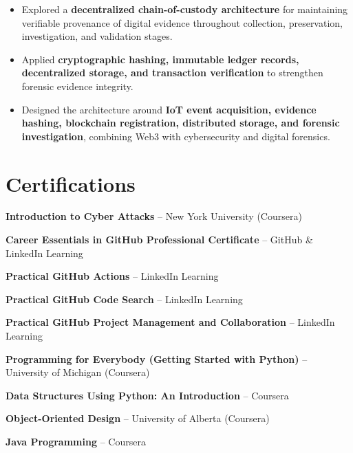 \documentclass[a4paper,11pt]{article}
\newcommand{\resumeItem}[1]{
    \item \small{#1 \vspace{-2pt}}
}
\begin{document}
\begin{itemize}[leftmargin=*]

\resumeItem{Explored a \textbf{decentralized chain-of-custody architecture} for maintaining verifiable provenance of digital evidence throughout collection, preservation, investigation, and validation stages.}

\resumeItem{Applied \textbf{cryptographic hashing, immutable ledger records, decentralized storage, and transaction verification} to strengthen forensic evidence integrity.}

\resumeItem{Designed the architecture around \textbf{IoT event acquisition, evidence hashing, blockchain registration, distributed storage, and forensic investigation}, combining Web3 with cybersecurity and digital forensics.}

\end{itemize}

\vspace{-8pt}


\section{Certifications}

\begin{itemize}[leftmargin=0in, label={}]

\small{

\item{
\textbf{Introduction to Cyber Attacks} -- New York University (Coursera)
}

\item{
\textbf{Career Essentials in GitHub Professional Certificate} -- GitHub \& LinkedIn Learning
}

\item{
\textbf{Practical GitHub Actions} -- LinkedIn Learning
}

\item{
\textbf{Practical GitHub Code Search} -- LinkedIn Learning
}

\item{
\textbf{Practical GitHub Project Management and Collaboration} -- LinkedIn Learning
}

\item{
\textbf{Programming for Everybody (Getting Started with Python)} -- University of Michigan (Coursera)
}

\item{
\textbf{Data Structures Using Python: An Introduction} -- Coursera
}

\item{
\textbf{Object-Oriented Design} -- University of Alberta (Coursera)
}

\item{
\textbf{Java Programming} -- Coursera
}

}

\end{itemize}
\end{document}
